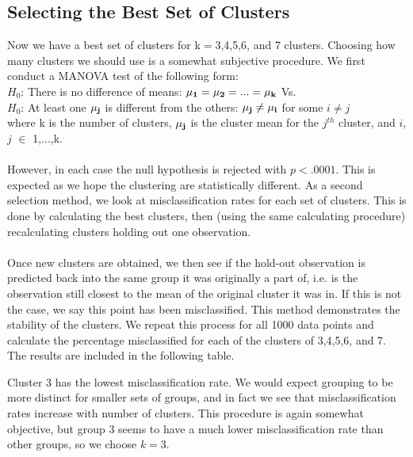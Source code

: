 \documentclass[11pt]{article}
\begin{document}
\subsection*{Selecting the Best Set of Clusters}
Now we have a best set of clusters for k$=$3,4,5,6, and 7 clusters. Choosing how
many clusters we should use is a somewhat subjective procedure. We first conduct
a MANOVA test of the following form: 
\\
\indent $H_0$: There is no difference of means: $\bf{\mu}_{1} = \bf{\mu}_{2} =
... = \bf{\mu}_{k}$ Vs.
\\
\indent $H_0$: At least one $\bf{\mu}_{j}$ is different from the others: $\bf{\mu}_{j} \ne \bf{\mu}_{i}$ for some $i \ne j$
\\
where k is the number of clusters, $\bf{\mu}_{j}$ is the cluster mean for the $j^{th}$ cluster, and $i$, $j$ $\in$ 1,...,k.
\\
\\ 
However, in each case the null hypothesis is rejected with $p<.0001$. This is
expected as we hope the clustering are statistically different. As a second
selection method, we look at misclassification rates for each set of clusters.
This is done by calculating the best clusters, then (using the same calculating
procedure) recalculating clusters holding out one observation. 
\\
\\
Once new clusters are obtained, we then see if the hold-out observation is
predicted back into the same group it was originally a part of, i.e. is the
observation still closest to the mean of the original cluster it was in. If this
is not the case, we say this point has been misclassified. This method
demonstrates the stability of the clusters. We repeat this process for all 1000
data points and calculate the percentage misclassified for each of the clusters
of 3,4,5,6, and 7. The results are included in the following table.



\noindent Cluster 3 has the lowest misclassification rate. We would expect
grouping to be more distinct for smaller sets of groups, and in fact we see that
misclassification rates increase with number of clusters. This procedure is
again somewhat objective, but group 3 seems to have a much lower
misclassification rate than other groups, so we choose $k=3$.
\end{document}
